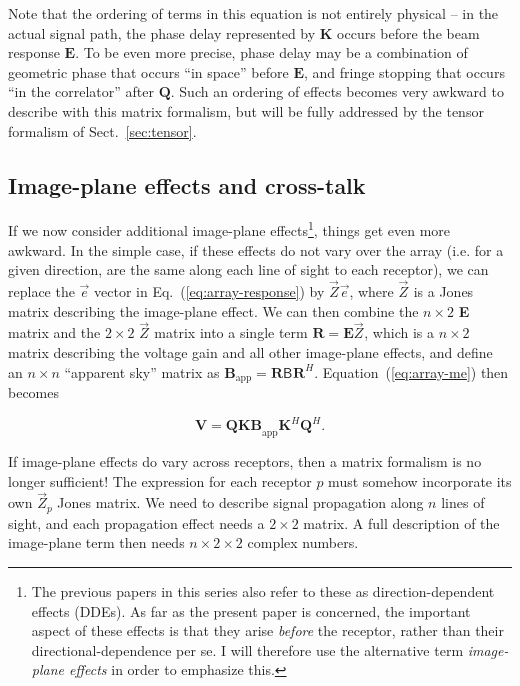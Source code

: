 \documentclass[]{aa}
\newcommand{\herm}{H}
\newcommand{\jones}[2]{\vec {#1}_{#2}}
\newcommand{\coh}[2]{\mathsf{{#1}}_{{#2}}}
\begin{document}
Note that the ordering of terms in this equation is not entirely physical
-- in the actual signal path, the phase delay represented by $\mathbf{K}$
occurs before the beam response $\mathbf{E}$. To be even more precise, phase 
delay may be a combination of geometric phase that occurs ``in space'' before $\mathbf{E}$, and fringe stopping 
that occurs ``in the correlator'' after $\mathbf{Q}$. Such an ordering of effects 
becomes very awkward to describe with this matrix formalism,  
but will be fully addressed by the tensor formalism of Sect.~\ref{sec:tensor}.

\subsection{Image-plane effects and cross-talk}
\label{sec:matrix-image-plane}

If we now consider additional image-plane effects\footnote{The previous papers in this series \citep{RRIME1,RRIME2,RRIME3} also refer to these as direction-dependent effects (DDEs). As far as the present paper is concerned, the important aspect of these effects is that they arise \emph{before} the receptor, rather than their directional-dependence per se. I will therefore use the alternative term \emph{image-plane effects} in order to emphasize this.}, things get even more awkward. In the simple case,
if these effects do not vary over the array (i.e. for a given direction, are the same along each line of sight to each receptor), 
we can replace the $\vec e$ vector in Eq.~(\ref{eq:array-response}) by $\jones{Z}{}\vec e$, where $\jones{Z}{}$ is a Jones matrix
describing the image-plane effect. We can then combine the $n\times2$
\textbf{E} matrix and the $2\times2$ $\jones{Z}{}$ matrix into a single
term $\mathbf{R}=\mathbf{E}\jones{Z}{}$, which is a $n\times2$ matrix describing
the voltage gain and all other image-plane effects, and define an $n\times n$ ``apparent
sky'' matrix as $\mathbf{B}_\mathrm{app} = \mathbf{R} \coh{B}{} \mathbf{R}^\herm$.  
Equation~(\ref{eq:array-me}) then becomes

\[
\mathbf{V}=\mathbf{QKB}_\mathrm{app} \mathbf{K}^\herm \mathbf{Q}^\herm.
\]

If image-plane effects do vary across receptors, then a matrix formalism
is no longer sufficient! The expression for each receptor
$p$ must somehow incorporate its own $\jones{Z}{p}$ Jones matrix.
We need to describe signal propagation along $n$ lines of sight,
and each propagation effect needs a $2\times2$ matrix. A full description of 
the image-plane term then needs $n\times2\times2$ complex numbers. 
\end{document}
